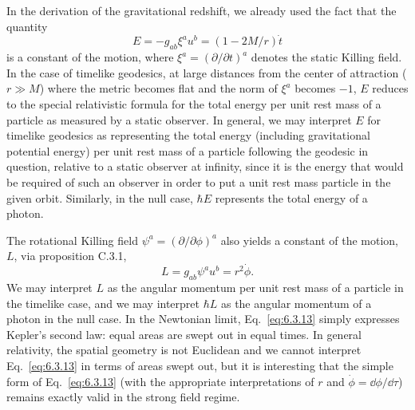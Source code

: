 In the derivation of the gravitational redshift, we already used the fact that
the quantity
\begin{equation}
  E=-g_{ab}\xi^au^b=(1-2M/r)\dot t
  \tag{6.3.12}\label{eq:6.3.12}
\end{equation}
is a constant of the motion, where \(\xi^a=(\partial/\partial t)^a\) denotes the
static Killing field. In the case of timelike geodesics, at large distances from
the center of attraction (\(r\gg M\)) where the metric becomes flat and the norm
of \(\xi^a\) becomes \(-1\), \(E\) reduces to the special relativistic formula
for the total energy per unit rest mass of a particle as measured by a static
observer. In general, we may interpret \(E\) for timelike geodesics as
representing the total energy (including gravitational potential energy) per unit
rest mass of a particle following the geodesic in question, relative to a static
observer at infinity, since it is the energy that would be required of such an
observer in order to put a unit rest mass particle in the given orbit. Similarly,
in the null case, \(\hbar E\) represents the total energy of a photon.

The rotational Killing field \(\psi^a=(\partial/\partial\phi)^a\) also yields a
constant of the motion, \(L\), via proposition C.3.1,
\begin{equation}
  L=g_{ab}\psi^au^b=r^2\dot\phi.
  \tag{6.3.13}\label{eq:6.3.13}
\end{equation}
We may interpret \(L\) as the angular momentum per unit rest mass of a particle
in the timelike case, and we may interpret \(\hbar L\) as the angular momentum of
a photon in the null case. In the Newtonian limit, Eq.~\eqref{eq:6.3.13} simply
expresses Kepler's second law: equal areas are swept out in equal times. In
general relativity, the spatial geometry is not Euclidean and we cannot interpret
Eq.~\eqref{eq:6.3.13} in terms of areas swept out, but it is interesting that the
simple form of Eq.~\eqref{eq:6.3.13} (with the appropriate interpretations of
\(r\) and \(\dot\phi=\dd\phi/\dd\tau\)) remains exactly valid in the strong field
regime.

